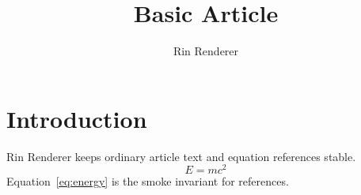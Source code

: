 \documentclass{article}
\title{Basic Article}
\author{Rin Renderer}
\begin{document}
\maketitle
\section{Introduction}
Rin Renderer keeps ordinary article text and equation references stable.
\begin{equation}
E = mc^2
\label{eq:energy}
\end{equation}
Equation~\ref{eq:energy} is the smoke invariant for references.
\end{document}
